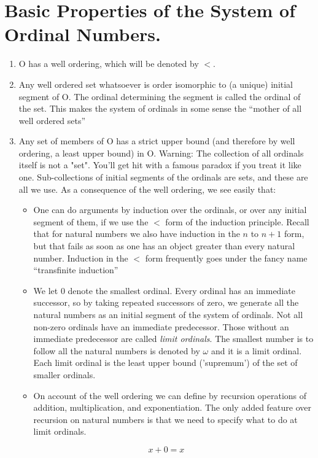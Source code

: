 \documentclass[a4paper,10pt]{article}
\begin{document}
\section{Basic Properties of the System of Ordinal Numbers.}
\begin{enumerate}
 \item O has a well ordering, which will be denoted by $\lt$.
\item Any well ordered set whatsoever is order isomorphic to (a unique) initial segment of O. 
The ordinal determining the segment is called the ordinal of the set. This makes the system of ordinals in some sense
the ``mother of all well ordered sets''
\item Any set of members of O has a strict upper bound (and therefore by well ordering, a least upper bound) in O.
Warning: The collection of all ordinals itself is not a "set". You'll get hit with a famous paradox if you treat
it like one. Sub-collections of initial segments of the ordinals are sets, and these are all we use. 
As a consequence of the well ordering, we see easily that:
\begin{itemize}
 \item One can do arguments by induction over the ordinals, or over any initial segment of them, if we use the 
$\lt$ form of the induction principle. Recall that for natural numbers we also have induction in the $n$ to $n+1$
form, but that fails as soon as one has an object greater than every natural number. Induction in the $\lt$ form
frequently goes under the fancy name ``transfinite induction''
\item We let 0 denote the smallest ordinal. Every ordinal has an immediate successor, so by taking repeated successors 
of zero, we generate all the natural numbers as an initial segment of the system of ordinals. Not all non-zero ordinals
have an immediate predecessor. Those without an immediate predecessor are called \textit{limit ordinals}. The smallest
number is to follow all the natural numbers is denoted by $\omega$ and it is a limit ordinal. Each limit ordinal
is the least upper bound ('supremum') of the set of smaller ordinals. 
\item On account of the well ordering we can define by recursion operations of addition, multiplication, and 
exponentiation. The only added feature over recursion on natural numbers is that we need to specify what to
do at limit ordinals.
\end{itemize}
\begin{equation}
 x + 0 = x
\end{equation}

\end{enumerate}
\end{document}
